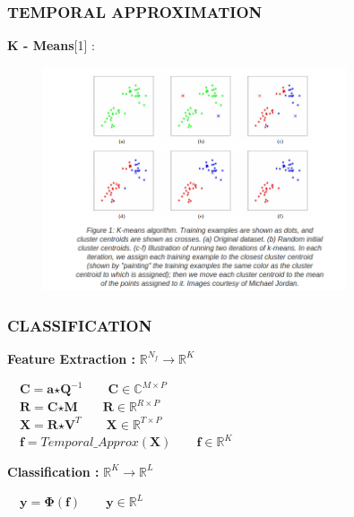 \documentclass{beamer}
\begin{document}
\begin{frame}
\frametitle{TEMPORAL APPROXIMATION}
\textbf{K - Means}[1] :
\begin{figure}
\includegraphics[width=0.8\textwidth]{kmeans}
\end{figure}
\end{frame}

\begin{frame}
\frametitle{CLASSIFICATION}
\textbf{Feature Extraction :} $\mathbb{R}^{N_{f}} \rightarrow \mathbb{R}^{K}$
\bigskip

$\quad \textbf{C} = \textbf{a} \bm{\star} \textbf{Q}^{-1} \qquad \textbf{C} \in \mathbb{C}^{M \times P}$\\
$\quad \textbf{R} = \textbf{C} \bm{\star} \textbf{M} \qquad \textbf{R} \in \mathbb{R}^{R \times P}$\\
$\quad \textbf{X} = \textbf{R} \bm{\star} \textbf{V}^{T} \qquad \textbf{X} \in \mathbb{R}^{T \times P}$\\
$\quad \textbf{f} = Temporal\_Approx(\textbf{X}) \qquad \textbf{f} \in \mathbb{R}^{K}$\\
\bigskip

\textbf{Classification :} $\mathbb{R}^{K} \rightarrow \mathbb{R}^{L}$
\bigskip

$\quad \textbf{y} = \bm{\Phi}(\textbf{f}) \qquad \textbf{y} \in \mathbb{R}^{L}$
\end{frame}
\end{document}
